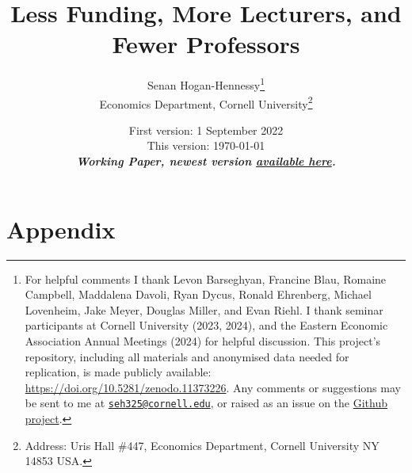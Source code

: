 \documentclass[notitlepage,12pt]{article}
\author{Senan Hogan-Hennessy\thanks{
        For helpful comments I thank
        Levon Barseghyan,
        Francine Blau,
        Romaine Campbell,
        Maddalena Davoli,
        Ryan Dycus,
        Ronald Ehrenberg,
        Michael Lovenheim,
        Jake Meyer,
        Douglas Miller,
        and Evan Riehl.
        I thank seminar participants at Cornell University (2023, 2024), and the Eastern Economic Association Annual Meetings (2024) for helpful discussion.
        This project's repository, including all materials and anonymised data needed for replication, is made publicly available: 
        \url{https://doi.org/10.5281/zenodo.11373226}.
        Any comments or suggestions may be sent to me at \href{mailto:seh325@cornell.edu}{\nolinkurl{seh325@cornell.edu}}, or raised as an issue on the \href{https://github.com/shoganhennessy/state-funding-faculty/}{Github project}.
    } \\
    \vspace{0.1cm}
    Economics Department, Cornell University\footnote{
        Address: Uris Hall \#447, Economics Department, Cornell University NY 14853 USA.
    }
}
\title{Less Funding, More Lecturers, and Fewer Professors}
\date{First version: 1 September 2022 \\ \vspace{0.15cm}
    This version:
        \today \\ \vspace{0.25cm}
    \textbf{\textit{Working Paper,
    newest version
    \href{https://raw.githubusercontent.com/shoganhennessy/state-funding-faculty/main/state-funding-faculty-2024.pdf}{available here}.}}
    \vspace{-0.5cm}
}
\begin{document}
\maketitle
\thispagestyle{empty}
\begin{abstract}
    \noindent
    
\end{abstract}

\newpage
\setcounter{page}{1}
\onehalfspacing
\noindent








\singlespacing



\newpage
\appendix
\setcounter{table}{0}
\renewcommand{\thetable}{A\arabic{table}}
\setcounter{figure}{0}
\renewcommand{\thefigure}{A\arabic{figure}}
\section{Appendix}

\end{document}
